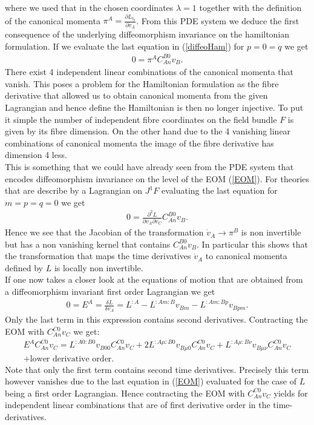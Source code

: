 \documentclass[a4paper,12pt, DIV=14, BCOR=5mm, twoside, headsepline]{scrbook}
\begin{document}
where we used that in the chosen coordinates $\lambda = 1$ together with the definition of the canonical momenta $\pi^A = \frac{\partial L_{t_0}}{\partial \dot{v}_A}$. 
From this PDE system we deduce the first consequence of the underlying diffeomorphism invariance on the hamiltonian formulation. If we evaluate the last equation in (\ref{diffeoHam}) for $p=0=q$ we get 
\begin{align}\label{ConstrPi}
    0=\pi^A C_{An}^{B0}v_B.
\end{align}
There exist 4 independent linear combinations of the canonical momenta that vanish. This poses a problem for the Hamiltonian formulation as the fibre derivative that allowed us to obtain canonical momenta from the given Lagrangian and hence define the Hamiltonian is then no longer injective. To put it simple the number of independent fibre coordinates on the field bundle $F$ is given by its fibre dimension. On the other hand due to the 4 vanishing linear combinations of canonical momenta the image of the fibre derivative has dimension 4 less.\\

This is something that we could have already seen from the PDE system that encodes diffeomorphism invariance on the level of the EOM (\ref{EOM}). For theories that are describe by a Lagrangian on $J^1F$ evaluating the last equation for $m=p=q=0$ we get 
\begin{align}\label{Constr1}
    0 = \frac{\partial^2 L}{\partial \dot{v}_A \partial \dot{v}_C } C_{An}^{B0} v_B.
\end{align}
Hence we see that the Jacobian of the transformation $\dot{v}_A \rightarrow \pi^B$ is non invertible but has a non vanishing kernel that contains $C_{An}^{B0}v_B$. In particular this shows that the transformation that maps the time derivatives $\dot{v}_A$ to canonical momenta defined by $L$ is locally non invertible. \\

If one now takes a closer look at the equations of motion that are obtained from a diffeomorphism invariant first order Lagrangian we get
\begin{align}
    0 = E^A = \frac{\delta L}{\delta v_A} = L^{:A} - L^{:Am:B} v_{Bm} - L^{:Am:Bp}v_{Bpm}.
\end{align}
Only the last term in this expression contains second derivatives.
Contracting the EOM with $C_{An}^{C0}v_C$ we get:
\begin{multline}
    E^A C_{An}^{C0}v_C = L^{:A0:B0}v_{B00}C_{An}^{C0}v_C + 2L^{:A\mu : B 0} v_{B\mu 0}C_{An}^{C0}v_C + L^{:A\mu : B \nu} v_{B\mu \nu}C_{An}^{C0}v_C\\
    + \text{lower derivative order}.
\end{multline}
Note that only the first term contains second time derivatives. Precisely this term however vanishes due to the last equation in (\ref{EOM}) evaluated for the case of $L$ being a first order Lagrangian. Hence contracting the EOM with $C_{An}^{C0}v_C$ yields for independent linear combinations that are of first derivative order in the time-derivatives.
\end{document}

